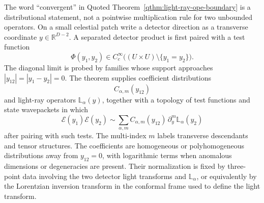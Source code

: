 The word ``convergent'' in
Quoted Theorem~\ref{qthm:light-ray-ope-boundary} is a distributional
statement, not a pointwise multiplication rule for two unbounded operators.
On a small celestial patch write a detector direction as a transverse
coordinate \(y\in\mathbb R^{D-2}\).  A separated detector product is first
paired with a test function
\[
  \Phi(y_1,y_2)
  \in C_c^\infty\bigl((U\times U)\setminus \{y_1=y_2\}\bigr).
\]
The diagonal limit is probed by families whose support approaches
\(|y_{12}|=|y_1-y_2|=0\).  The theorem supplies coefficient distributions
\[
  C_{\alpha,m}(y_{12})
\]
and light-ray operators \(\mathbb L_\alpha(y)\), together with a topology of
test functions and state wavepackets in which
\begin{equation}
  \mathcal E(y_1)\mathcal E(y_2)
  \sim
  \sum_{\alpha,m}
  C_{\alpha,m}(y_{12})\,
  \partial_y^m\mathbb L_\alpha(y_2)
  \label{eq:cft-light-ray-ope-local-form}
\end{equation}
after pairing with such tests.  The multi-index \(m\) labels transverse
descendants and tensor structures.  The coefficients are homogeneous or
polyhomogeneous distributions away from \(y_{12}=0\), with logarithmic terms
when anomalous dimensions or degeneracies are present.  Their normalization
is fixed by three-point data involving the two detector light transforms and
\(\mathbb L_\alpha\), or equivalently by the Lorentzian inversion transform
in the conformal frame used to define the light transform.

